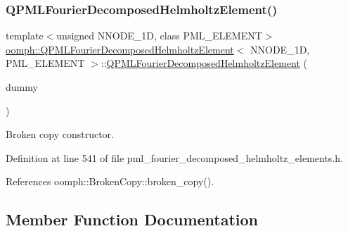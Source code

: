 \subsubsection{\texorpdfstring{Q\+P\+M\+L\+Fourier\+Decomposed\+Helmholtz\+Element()}{QPMLFourierDecomposedHelmholtzElement()}\hspace{0.1cm}{\footnotesize\ttfamily [2/2]}}
{\footnotesize\ttfamily template$<$unsigned N\+N\+O\+D\+E\+\_\+1D, class P\+M\+L\+\_\+\+E\+L\+E\+M\+E\+NT$>$ \\
\hyperlink{classoomph_1_1QPMLFourierDecomposedHelmholtzElement}{oomph\+::\+Q\+P\+M\+L\+Fourier\+Decomposed\+Helmholtz\+Element}$<$ N\+N\+O\+D\+E\+\_\+1D, P\+M\+L\+\_\+\+E\+L\+E\+M\+E\+NT $>$\+::\hyperlink{classoomph_1_1QPMLFourierDecomposedHelmholtzElement}{Q\+P\+M\+L\+Fourier\+Decomposed\+Helmholtz\+Element} (\begin{DoxyParamCaption}\item[{const \hyperlink{classoomph_1_1QPMLFourierDecomposedHelmholtzElement}{Q\+P\+M\+L\+Fourier\+Decomposed\+Helmholtz\+Element}$<$ N\+N\+O\+D\+E\+\_\+1D, P\+M\+L\+\_\+\+E\+L\+E\+M\+E\+NT $>$ \&}]{dummy }\end{DoxyParamCaption})\hspace{0.3cm}{\ttfamily [inline]}}



Broken copy constructor. 



Definition at line 541 of file pml\+\_\+fourier\+\_\+decomposed\+\_\+helmholtz\+\_\+elements.\+h.



References oomph\+::\+Broken\+Copy\+::broken\+\_\+copy().



\subsection{Member Function Documentation}
\mbox{\label{classoomph_1_1QPMLFourierDecomposedHelmholtzElement_a40b27cbfd852c4b678596070d1dd2d8b}} 
